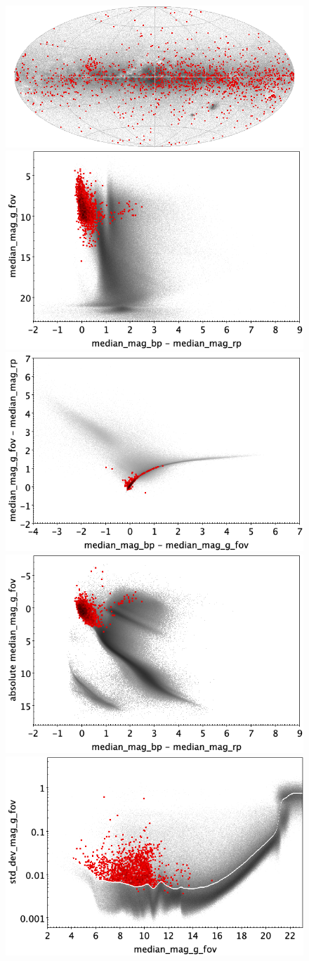 \documentclass[longauth]{aa}
\begin{document}
\begin{appendix}
\begin{figure}
\centering
{} \includegraphics[width=0.6\hsize]{figures/appendix/ACV_trn_sky.png} \\ %
\vspace{4mm}
 \includegraphics[width=0.45\hsize]{figures/appendix/ACV_trn_cm.png}  %
\hspace{2mm}
 \includegraphics[width=0.45\hsize]{figures/appendix/ACV_trn_cc.png} \\ %
\vspace{4mm}
 \includegraphics[width=0.45\hsize]{figures/appendix/ACV_trn_cam.png}  %
\hspace{2mm}
 \includegraphics[width=0.45\hsize]{figures/appendix/ACV_trn_msd.png} \\ %

\end{figure}
\end{appendix}
\end{document}
